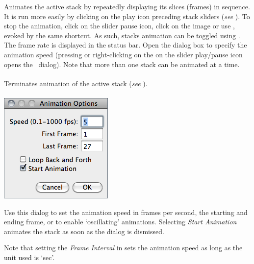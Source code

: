 Animates the active stack by repeatedly displaying its slices (frames)
in sequence. It is run more easily by clicking on the play icon preceding
stack sliders (\emph{see }). To stop the
animation, click on the slider pause icon, click on the image or use
, evoked by the same
shortcut. As such, stacks animation can be toggled using \mykeystroke{\textbackslash{}}.
The frame rate is displayed in the status bar. Open the 
dialog box to specify the animation speed (pressing 
\mykeystroke{\textbackslash{}} or right-clicking on the on the slider
play/pause icon opens the \ dialog).
Note that more than one stack can be animated at a time.


\paragraph{\protect{}\label{sub:Stop-Animation}}

Terminates animation of the active stack (\emph{see} ). 


\paragraph{\protect{}\label{sub:Animation-Options...}}

\begin{minipage}[c][1\totalheight][t]{0.315\columnwidth}%
\includegraphics[scale=0.55]{images/AnimationOptions}%
\end{minipage}%
\begin{minipage}[c][1\totalheight][t]{0.685\columnwidth}%
Use this dialog to set the animation speed in frames per second,
the starting and ending frame, or to enable `oscillating' animations.
Selecting \emph{Start Animation} animates the stack as soon as the
dialog is dismissed.

\medskip{}


Note that setting the \emph{Frame Interval} in 
sets the animation speed as long as the unit used is `sec'.%
\end{minipage}


